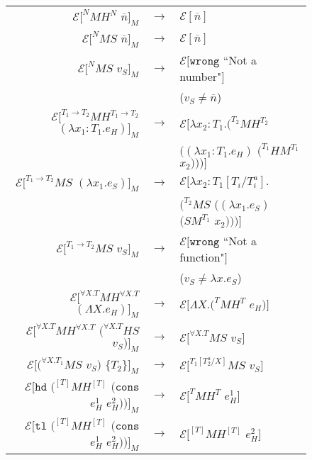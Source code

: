 \begin{figure}[p]
\centering
\begin{tabular}{rcl}
$\mathscr{E}[^{N}MH^{N}$ $\overline{n}]_{M}$ & $\rightarrow$ & $\mathscr{E}[\overline{n}]$ \\
$\mathscr{E}[^{N}MS$ $\overline{n}]_{M}$ & $\rightarrow$ & $\mathscr{E}[\overline{n}]$ \\
$\mathscr{E}[^{N}MS$ $v_{S}]_{M}$ & $\rightarrow$ & $\mathscr{E}[\mathtt{wrong}$ ``Not a number"$]$ \\
&& ($v_{S}\neq\overline{n}$) \\
$\mathscr{E}[^{T_{1}\rightarrow T_{2}}MH^{T_{1}\rightarrow T_{2}}$ $(\lambda x_{1}:T_{1}.e_{H})]_{M}$ & $\rightarrow$ & $\mathscr{E}[\lambda x_{2}:T_{1}.(^{T_{2}}MH^{T_{2}}$ \\
&& $((\lambda x_{1}:T_{1}.e_{H})$ $(^{T_{1}}HM^{T_{1}}$ $x_{2})))]$ \\
$\mathscr{E}[^{T_{1}\rightarrow T_{2}}MS$ $(\lambda x_{1}.e_{S})]_{M}$ & $\rightarrow$ & $\mathscr{E}[\lambda x_{2}:T_{1}[T_{i}/T^{a}_{i}].$ \\
&& $(^{T_{2}}MS$ $((\lambda x_{1}.e_{S})$ $(SM^{T_{1}}$ $x_{2})))]$ \\
$\mathscr{E}[^{T_{1}\rightarrow T_{2}}MS$ $v_{S}]_{M}$ & $\rightarrow$ & $\mathscr{E}[\mathtt{wrong}$ ``Not a function"$]$ \\
&& ($v_{S}\neq\lambda x.e_{S}$) \\
$\mathscr{E}[^{\forall X.T}MH^{\forall X.T}$ $(\Lambda X.e_{H})]_{M}$ & $\rightarrow$ & $\mathscr{E}[\Lambda X.(^{T}MH^{T}$ $e_{H})]$ \\
$\mathscr{E}[^{\forall X.T}MH^{\forall X.T}$ $(^{\forall X.T}HS$ $v_{S})]_{M}$ & $\rightarrow$ & $\mathscr{E}[^{\forall X.T}MS$ $v_{S}]$ \\
$\mathscr{E}[(^{\forall X.T_{1}}MS$ $v_{S})$ $\lbrace T_{2}\rbrace]_{M}$ & $\rightarrow$ & $\mathscr{E}[^{T_{1}[T^{a}_{2}/X]}MS$ $v_{S}]$ \\
$\mathscr{E}[\mathtt{hd}$ $(^{[T]}MH^{[T]}$ $(\mathtt{cons}$ $e_{H}^{1}$ $e_{H}^{2}))]_{M}$ & $\rightarrow$ & $\mathscr{E}[^{T}MH^{T}$ $e_{H}^{1}]$ \\
$\mathscr{E}[\mathtt{tl}$ $(^{[T]}MH^{[T]}$ $(\mathtt{cons}$ $e_{H}^{1}$ $e_{H}^{2}))]_{M}$ & $\rightarrow$ & $\mathscr{E}[^{[T]}MH^{[T]}$ $e_{H}^{2}]$ \\

\end{tabular}
\end{figure}
